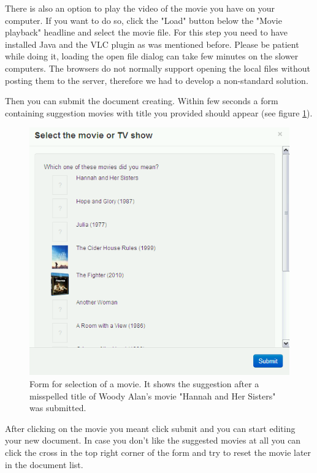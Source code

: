 There is also an option to play the video of the movie you have on your computer. If you want to do so, click the "Load" button below the "Movie playback" headline and select the movie file. For this step you need to have installed Java and the VLC plugin as was mentioned before. Please be patient while doing it, loading the open file dialog can take few minutes on the slower computers. The browsers do not normally support opening the local files without posting them to the server, therefore we had to develop a non-standard solution.

Then you can submit the document creating. Within few seconds a form containing suggestion movies with title you provided should appear (see figure \ref{fig:media_sources}).

\begin{figure}
\begin{center}
\includegraphics[scale=0.4]{figures/user_manual/media_sources.png}
\end{center}
\caption{Form for selection of a movie. It shows the suggestion after a misspelled title of Woody Alan's movie "Hannah and Her Sisters" was submitted.}
\label{fig:media_sources}
\end{figure}

After clicking on the movie you meant click submit and you can start editing your new document. In case you don't like the suggested movies at all you can click the cross in the top right corner of the form and try to reset the movie later in the document list.

